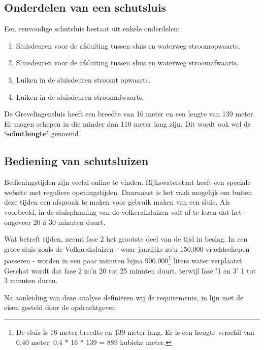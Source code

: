 \documentclass{article} %
\begin{document}
\subsection{Onderdelen van een schutsluis}
Een eenvoudige schutsluis bestaat uit enkele onderdelen:
\begin{enumerate}
    \item Sluisdeuren voor de afsluiting tussen sluis en waterweg stroomopwaarts.
    \item Sluisdeuren voor de afsluiting tussen sluis en waterweg stroomafwaarts.
    \item Luiken in de sluisdeuren stroomt opwaarts.
    \item Luiken in de sluisdeuren stroomafwaarts.
\end{enumerate}
De Grevelingensluis heeft een breedte van 16 meter en een lengte van 139 meter. Er mogen schepen in die minder dan 110 meter lang zijn. Dit wordt ook wel de \textbf{‘schutlengte’} genoemd. \cite{WaterkaartGrevelingensluis}

\subsection{Bediening van schutsluizen} \label{paragraaf 1.6}
Bedieningstijden zijn veelal online te vinden. Rijkswaterstaat heeft een speciale website met reguliere openingstijden. Daarnaast is het vaak mogelijk om buiten deze tijden een afspraak te maken voor gebruik maken van een sluis. Als voorbeeld, in de sluisplanning van de volkeraksluizen valt af te lezen dat het ongeveer 20 á 30 minuten duurt. \cite{vaarweginformatie, volkeraksluizen, SluisplanningVolkeraksluizen} \par 

Wat betreft tijden, neemt fase 2 het grootste deel van de tijd in beslag. In een grote sluis zoals de Volkaraksluizen - waar jaarlijks zo’n 150.000 vrachtschepen passeren - worden in een paar minuten bijna 900.000\footnote{De sluis is 16 meter breedte en 139 meter lang. Er is een hoogte verschil van 0.40 meter. 0.4 * 16 * 139 = 889 kubieke meter.} liters water verplaatst. \cite{WaterkaartVolkeraksluizen} Geschat wordt dat fase 2 zo’n 20 tot 25 minuten duurt, terwijl fase '1 en 3' 1 tot 3 minuten duren. \par

Na aanleiding van deze analyse definiëren wij de requirements, in lijn met de eisen gesteld door de opdrachtgever. \par

\newpage
\end{document}
